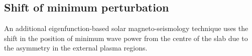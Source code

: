 \documentclass[namedreferences]{solarphysics}
\numberwithin{equation}{section}
\begin{document}
\begin{article}


\section{Shift of minimum perturbation}
An additional eigenfunction-based solar magneto-seismology technique uses the shift in the position of minimum wave power from the centre of the slab due to the asymmetry in the external plasma regions.


\end{article}
\end{document}
